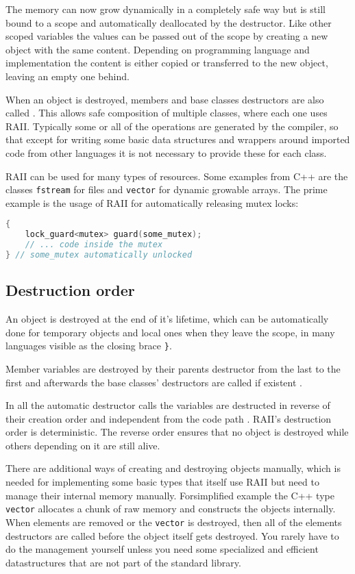 \documentclass[conference,twocolumn]{IEEEtran}
\begin{document}
The memory can now grow dynamically in a completely safe way but is still bound to a scope and automatically deallocated by the destructor. Like other scoped variables the values can be passed out of the scope by creating a new object with the same content. Depending on programming language and implementation the content is either copied or transferred to the new object, leaving an empty one behind.

When an object is destroyed, members and base classes destructors are also called \cite{cpp14std}. This allows safe composition of multiple classes, where each one uses RAII.
Typically some or all of the operations are generated by the compiler, so that except for writing some basic data structures and wrappers around imported code from other languages it is not necessary to provide these for each class.

RAII can be used for many types of resources. Some examples from C++ are the classes \verb|fstream| for files and \verb|vector| for dynamic growable arrays. The prime example is the usage of RAII for automatically releasing mutex locks:
\begin{lstlisting}[language=c++, frame=single]
{
    lock_guard<mutex> guard(some_mutex);
    // ... code inside the mutex
} // some_mutex automatically unlocked
\end{lstlisting}


\subsection{Destruction order}

An object is destroyed at the end of it's lifetime, which can be automatically done for temporary objects and local ones when they leave the scope, in many languages visible as the closing brace \verb|}|.

Member variables are destroyed by their parents destructor from the last to the first and afterwards the base classes' destructors are called if existent \cite{cpp14std}.

In all the automatic destructor calls the variables are destructed in reverse of their creation order and independent from the code path \cite{cpp14std}. RAII's destruction order is deterministic. The reverse order ensures that no object is destroyed while others depending on it are still alive.

There are additional ways of creating and destroying objects manually, which is needed for implementing some basic types that itself use RAII but need to manage their internal memory manually. Forsimplified example the C++ type \verb|vector| allocates a chunk of raw memory and constructs the objects internally. When elements are removed or the \verb|vector| is destroyed, then all of the elements destructors are called before the object itself gets destroyed. You rarely have to do the management yourself unless you need some specialized and efficient datastructures that are not part of the standard library.
\end{document}
